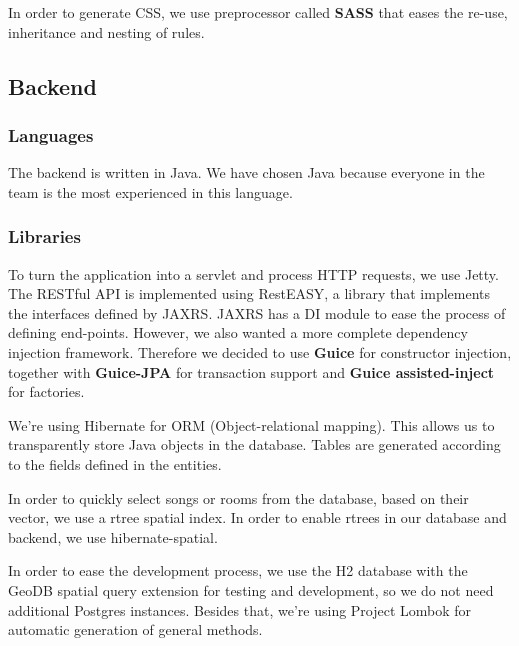 In order to generate \gls{CSS}, we use preprocessor called \textbf{SASS} that eases the re-use, inheritance and nesting of rules.

\subsection{Backend}

\subsubsection{Languages}
The backend is written in Java.
We have chosen Java because everyone in the team is the most experienced in this language.

\subsubsection{Libraries}
To turn the application into a servlet and process \gls{HTTP} requests, we use Jetty.
The RESTful API is implemented using RestEASY, a library that implements the interfaces defined by \gls{JAXRS}.
\gls{JAXRS} has a \gls{DI} module to ease the process of defining end-points.
However, we also wanted a more complete dependency injection framework.
Therefore we decided to use \textbf{Guice} for constructor injection, together with \textbf{Guice-JPA} for transaction support and \textbf{Guice assisted-inject} for factories.

We're using \gls{Hibernate} for \gls{ORM} (Object-relational mapping).
This allows us to transparently store Java objects in the database.
Tables are generated according to the fields defined in the entities.

In order to quickly select songs or rooms from the database, based on their vector, we use a \gls{rtree} spatial index.
In order to enable  \glspl{rtree} in our database and backend, we use \gls{hibernate-spatial}.

In order to ease the development process, we use the \gls{H2} database with the \gls{GeoDB} spatial query extension for testing and development, so we do not need additional \gls{Postgres} instances.
Besides that, we're using Project Lombok for automatic generation of general methods.

